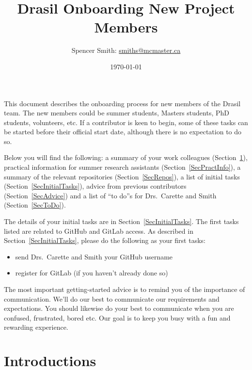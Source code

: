 \documentclass[12pt]{article}
\begin{document}
\title{Drasil Onboarding New Project Members}

\author{Spencer Smith: \href{mailto:smiths@mcmaster.ca}{smiths@mcmaster.ca}}
\date{\today}

\maketitle

\tableofcontents

\newpage

This document describes the onboarding process for new members of the Drasil
team.  The new members could be summer students, Masters students, PhD students,
volunteers, etc.  If a contributor is keen to begin, some of these tasks can be
started before their official start date, although there is no expectation to do
so.

Below you will find the following: a summary of your work colleagues
(Section~\ref{SecIntroductions}), practical information for summer research
assistants (Section~\ref{SecPractInfo}), a summary of the relevant repositories
(Section~\ref{SecRepos}), a list of initial tasks
(Section~\ref{SecInitialTasks}), advice from previous contributors
(Section~\ref{SecAdvice}) and a list of ``to do''s for Drs.\ Carette and Smith
(Section~\ref{SecToDo}). 

The details of your initial tasks are in Section~\ref{SecInitialTasks}.  The
first tasks listed are related to GitHub and GitLab access.  As described in
Section~\ref{SecInitialTasks}, please do the following as your first tasks:

\begin{itemize}
\item send Drs.\ Carette and Smith your GitHub username
\item register for GitLab (if you haven't already done so)
\end{itemize}

The most important getting-started advice is to remind you of the importance of
communication.  We'll do our best to communicate our requirements and
expectations.  You should likewise do your best to communicate when you are
confused, frustrated, bored etc.  Our goal is to keep you busy with a fun and
rewarding experience.

\section{Introductions} \label{SecIntroductions}
\end{document}
